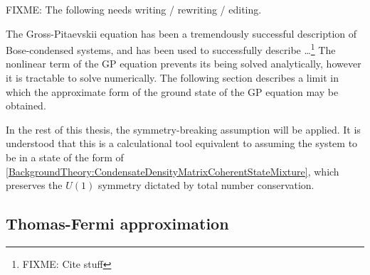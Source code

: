 \parasep

FIXME: The following needs writing / rewriting / editing.

The Gross-Pitaevskii equation has been a tremendously successful description of Bose-condensed systems, and has been used to successfully describe \dots\footnote{FIXME: Cite stuff}   The nonlinear term of the GP equation prevents its being solved analytically, however it is tractable to solve numerically.  The following section describes a limit in which the approximate form of the ground state of the GP equation may be obtained.

In the rest of this thesis, the symmetry-breaking assumption will be applied.  It is understood that this is a calculational tool equivalent to assuming the system to be in a state of the form of \eqref{BackgroundTheory:CondensateDensityMatrixCoherentStateMixture}, which preserves the $U(1)$ symmetry dictated by total number conservation.

\subsection{Thomas-Fermi approximation}

